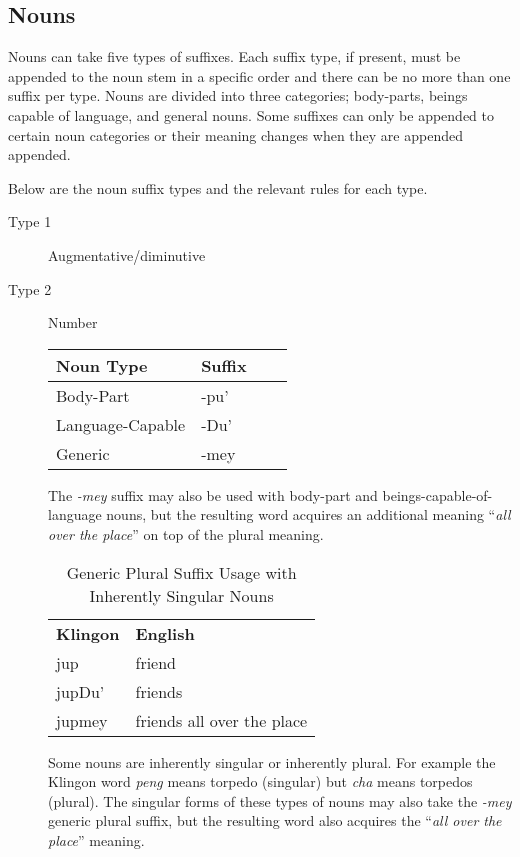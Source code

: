 \documentclass[11pt]{article}
\begin{document}
\subsection {Nouns}

Nouns can take five types of suffixes. Each suffix type, if present, must be appended to the noun stem in a specific order and there can be no more than one suffix per type. Nouns are divided into three categories; body-parts, beings capable of language, and general nouns. Some suffixes can only be appended to certain noun categories or their meaning changes when they are appended appended.

Below are the noun suffix types and the relevant rules for each type.

\begin{description}
	\item[Type 1] Augmentative/diminutive
	\item[Type 2] Number

	\begin{center}
	\begin{tabular}{ | l | l | l | l |}
	\hline
	\bf{Noun Type} & \bf{Suffix} \\ \hline
	Body-Part & -pu' \\ \hline
	Language-Capable & -Du' \\ \hline
	Generic & -mey \\
	\hline
	\end{tabular}
	\end{center}
	
	The \textit{-mey} suffix may also be used with body-part and beings-capable-of-language nouns, but the resulting word acquires an additional meaning ``\textit{all over the place}'' on top of the plural meaning.
	
\begin{table}[h]
\begin{center}
\begin{tabular}{l|l}
\bf Klingon & \bf English \\
jup & friend \\
jupDu' & friends \\
jupmey & friends all over the place \\
\end{tabular}
\end{center}
\caption{Generic Plural Suffix Usage with Inherently Singular Nouns}
\end{table}

	Some nouns are inherently singular or inherently plural. For example the Klingon word \textit{peng} means torpedo (singular) but \textit{cha} means torpedos (plural). The singular forms of these types of nouns may also take the \textit{-mey} generic plural suffix, but the resulting word also acquires the ``\textit{all over the place}'' meaning.
	

\end{description}
\end{document}
